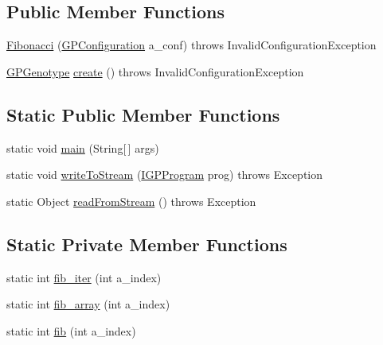 \subsection*{Public Member Functions}
\begin{DoxyCompactItemize}
\item 
\hyperlink{classexamples_1_1gp_1_1_fibonacci_a0f490a98e4d8c454e8dadedd78bef135}{Fibonacci} (\hyperlink{classorg_1_1jgap_1_1gp_1_1impl_1_1_g_p_configuration}{G\-P\-Configuration} a\-\_\-conf)  throws Invalid\-Configuration\-Exception 
\item 
\hyperlink{classorg_1_1jgap_1_1gp_1_1impl_1_1_g_p_genotype}{G\-P\-Genotype} \hyperlink{classexamples_1_1gp_1_1_fibonacci_a09f676281515cca71bae669293152c09}{create} ()  throws Invalid\-Configuration\-Exception 
\end{DoxyCompactItemize}
\subsection*{Static Public Member Functions}
\begin{DoxyCompactItemize}
\item 
static void \hyperlink{classexamples_1_1gp_1_1_fibonacci_aa302a328b0c018867302cf9ee1e6b418}{main} (String\mbox{[}$\,$\mbox{]} args)
\item 
static void \hyperlink{classexamples_1_1gp_1_1_fibonacci_ac0cc0c9e9c44f183f90084cd8e48cfe7}{write\-To\-Stream} (\hyperlink{interfaceorg_1_1jgap_1_1gp_1_1_i_g_p_program}{I\-G\-P\-Program} prog)  throws Exception 
\item 
static Object \hyperlink{classexamples_1_1gp_1_1_fibonacci_a20d007984347ba590b240dc5959f20c1}{read\-From\-Stream} ()  throws Exception 
\end{DoxyCompactItemize}
\subsection*{Static Private Member Functions}
\begin{DoxyCompactItemize}
\item 
static int \hyperlink{classexamples_1_1gp_1_1_fibonacci_a54e6bf56756c943fa5511ee787cdfdc8}{fib\-\_\-iter} (int a\-\_\-index)
\item 
static int \hyperlink{classexamples_1_1gp_1_1_fibonacci_a912d138b09850a18f6c6dbf7d386ef10}{fib\-\_\-array} (int a\-\_\-index)
\item 
static int \hyperlink{classexamples_1_1gp_1_1_fibonacci_ad391e29d5203df5912c8f395a61e859f}{fib} (int a\-\_\-index)
\end{DoxyCompactItemize}
